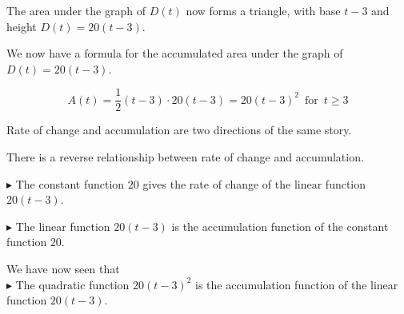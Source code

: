 \documentclass{ximera}
\begin{document}
The area under the graph of $D(t)$ now forms a triangle, with base $t-3$ and height $D(t) = 20(t-3)$.



We now have a formula for the accumulated area under the graph of $D(t) = 20(t-3)$.


\[
A(t) = \frac{1}{2} (t-3) \cdot 20(t-3) = 20 (t-3)^2   \, \text{ for }  \, t \geq 3
\]








\begin{image}
\end{image}

Rate of change and accumulation are two directions of the same story.



There is a reverse relationship between rate of change and accumulation.


$\blacktriangleright$ The constant function $20$ gives the rate of change of the linear function $20(t-3)$.


$\blacktriangleright$ The linear function $20(t-3)$ is the accumulation function of the constant function $20$.




We have now seen that \\

$\blacktriangleright$ The quadratic function $20(t-3)^2$ is the accumulation function of the linear function $20(t-3)$. \\
\end{document}
